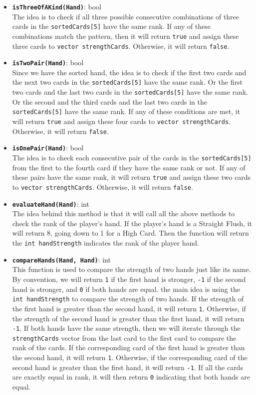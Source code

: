 \begin{enumerate}
\begin{itemize}
        \item \texttt{\textbf{isThreeOfAKind(Hand)}}: bool \\ The idea is to check if all three possible consecutive combinations of three cards in the \texttt{sortedCards[5]} have the same rank. If any of these combinations match the pattern, then it will return \texttt{true} and assign these three cards to \texttt{vector strengthCards}. Otherwise, it will return \texttt{false}.
        \item \texttt{\textbf{isTwoPair(Hand)}}: bool \\ Since we have the sorted hand, the idea is to check if the first two cards and the next two cards in the \texttt{sortedCards[5]} have the same rank. Or the first two cards and the last two cards in the \texttt{sortedCards[5]} have the same rank. Or the second and the third cards and the last two cards in the \texttt{sortedCards[5]} have the same rank. If any of these conditions are met, it will return \texttt{true} and assign these four cards to \texttt{vector strengthCards}. Otherwise, it will return \texttt{false}.
        \item \texttt{\textbf{isOnePair(Hand)}}: bool \\ The idea is to check each consecutive pair of the cards in the \texttt{sortedCards[5]} from the first to the fourth card if they have the same rank or not. If any of these pairs have the same rank, it will return \texttt{true} and assign these two cards to \texttt{vector strengthCards}. Otherwise, it will return \texttt{false}.
        \item \texttt{\textbf{evaluateHand(Hand)}}: int \\ The idea behind this method is that it will call all the above methods to check the rank of the player's hand. If the player's hand is a Straight Flush, it will return 8, going down to 1 for a High Card. Then the function will return the \texttt{int handStrength} indicates the rank of the player hand.
        \item \texttt{\textbf{compareHands(Hand, Hand)}}: int \\ This function is used to compare the strength of two hands just like its name. By convention, we will return \texttt{1} if the first hand is stronger, \texttt{-1} if the second hand is stronger, and \texttt{0} if both hands are equal. the main idea is using the \texttt{int handStrength} to compare the strength of two hands. If the strength of the first hand is greater than the second hand, it will return \texttt{1}. Otherwise, if the strength of the second hand is greater than the first hand, it will return \texttt{-1}. If both hands have the same strength, then we will iterate through the \texttt{strengthCards} vector from the last card to the first card to compare the rank of the cards. If the corresponding card of the first hand is greater than the second hand, it will return \texttt{1}. Otherwise, if the corresponding card of the second hand is greater than the first hand, it will return \texttt{-1}. If all the cards are exactly equal in rank, it will then return \texttt{0} indicating that both hands are equal.
    \end{itemize}


\end{enumerate}
